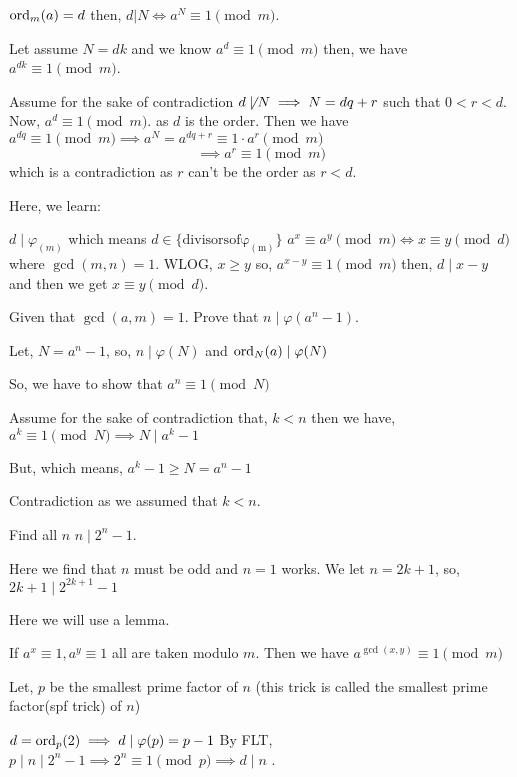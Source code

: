 \begin{theorem}
$\operatorname{ord}_m(a)=d$ then, $d|N \Leftrightarrow a^N \equiv 1 \pmod m$.
\end{theorem}
Let assume $N=dk$ and we know $a^d\equiv 1 \pmod m$ then, we have $a^{dk} \equiv 1 \pmod m$.

Assume for the sake of contradiction $d\not\mid N \implies N=dq+r $ such that $0<r<d$.
 Now, $a^d\equiv 1 \pmod m$. as $d$ is the order.
 Then we have $a^{dq}\equiv 1 \pmod m \implies a^N = a^{dq+r}\equiv 1 \cdot a^r \pmod m$
 \[\implies a^r \equiv 1  \pmod m \]
 which is a contradiction as $r$ can't be the order as $r<d$.

Here, we learn:
\begin{enumerate}
	\ii $d\mid \varphi_(m)$ which means $d\in \{ \mathrm{divisors of \varphi_(m)}\}$
	\ii $a^x\equiv a^y \pmod m \Leftrightarrow x\equiv y \pmod d$ where $\gcd(m,n) =1$.
	WLOG, $x\ge y$ so, $a^{x-y} \equiv 1 \pmod m$ then, $d\mid x-y $ and then we get $x\equiv y \pmod d$.

\end{enumerate}

\begin{example}
Given that $\gcd (a,m)=1$. Prove that $n\mid \varphi (a^n-1)$.
\end{example}
Let, $N=a^n-1$, so, $n\mid \varphi (N)$ and $\operatorname{ord}_N(a)\mid \varphi(N)$

So, we have to show that $a^n\equiv 1 \pmod N$

Assume for the sake of contradiction that, $k<n$ then we have, $a^k\equiv 1 \pmod N \implies N\mid a^k-1$

But, which means, $a^k-1 \ge N= a^n-1$

Contradiction as we assumed that $k<n$.

\begin{example}
Find all $n$ $n\mid 2^n-1$.
\end{example}
Here we find that $n$ must be odd and $n=1$ works. 
We let $n=2k+1$, so, $2k+1 \mid 2^{2k+1} -1$ 

Here we will use a lemma.
\begin{lemma}
If $a^x \equiv 1, a^y \equiv 1 $ all are taken modulo $m$. Then we have $a^{\gcd (x,y)} \equiv 1 \pmod m$
\end{lemma}

Let, $p$ be the smallest prime factor of $n$ (this trick is called the smallest prime factor(spf trick) of $n$)

$d=\operatorname{ord}_p(2)\implies d\mid \varphi(p)=p-1$
By FLT, $p\mid n \mid 2^n-1 \implies 2^n \equiv 1 \pmod p \implies d\mid n$ .

